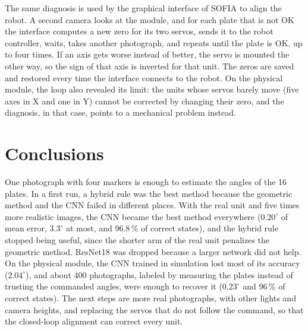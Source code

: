 \documentclass[lettersize,journal]{IEEEtran}
\begin{document}
	The same diagnosis is used by the graphical interface of SOFIA to align the robot. A second camera looks at the module, and for each plate that is not OK the interface computes a new zero for its two servos, sends it to the robot controller, waits, takes another photograph, and repeats until the plate is OK, up to four times. If an axis gets worse instead of better, the servo is mounted the other way, so the sign of that axis is inverted for that unit. The zeros are saved and restored every time the interface connects to the robot. On the physical module, the loop also revealed its limit: the units whose servos barely move (five axes in X and one in Y) cannot be corrected by changing their zero, and the diagnosis, in that case, points to a mechanical problem instead.

	\section{Conclusions}

	One photograph with four markers is enough to estimate the angles of the 16 plates. In a first run, a hybrid rule was the best method because the geometric method and the CNN failed in different places. With the real unit and five times more realistic images, the CNN became the best method everywhere ($0.20^\circ$ of mean error, $3.3^\circ$ at most, and 96.8\,\% of correct states), and the hybrid rule stopped being useful, since the shorter arm of the real unit penalizes the geometric method. ResNet18 was dropped because a larger network did not help. On the physical module, the CNN trained in simulation lost most of its accuracy ($2.04^\circ$), and about 400 photographs, labeled by measuring the plates instead of trusting the commanded angles, were enough to recover it ($0.23^\circ$ and 96\,\% of correct states). The next steps are more real photographs, with other lights and camera heights, and replacing the servos that do not follow the command, so that the closed-loop alignment can correct every unit.

	\balance

	
	
\end{document}
